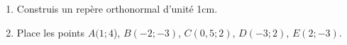 
\begin{enumerate}
\item Construis un repère orthonormal d'unité 1cm.
\item Place les points $A(1;4$), $B(-2;-3)$, $C(0,5;2)$, $D(-3;2)$, $E(2;-3)$. 
\end{enumerate}